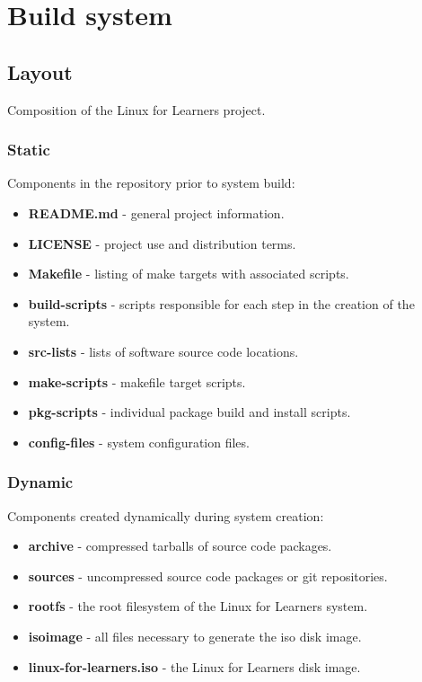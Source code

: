 \section{Build system}\label{Build system}

\subsection{Layout}

Composition of the Linux for Learners project.

\subsubsection{Static}

Components in the repository prior to system build:

\begin{itemize}
    \item \textbf{README.md} - general project information.
    \item \textbf{LICENSE} - project use and distribution terms.
    \item \textbf{Makefile} - listing of make targets with associated scripts.
    \item \textbf{build-scripts} - scripts responsible for each step in the creation of the system.
    \item \textbf{src-lists} - lists of software source code locations.
    \item \textbf{make-scripts} - makefile target scripts.
    \item \textbf{pkg-scripts} - individual package build and install scripts.
    \item \textbf{config-files} - system configuration files.
\end{itemize}

\subsubsection{Dynamic}

Components created dynamically during system creation:

\begin{itemize}
    \item \textbf{archive} - compressed tarballs of source code packages.
    \item \textbf{sources} - uncompressed source code packages or git repositories.
    \item \textbf{rootfs} - the root filesystem of the Linux for Learners system.
    \item \textbf{isoimage} - all files necessary to generate the iso disk image.
    \item \textbf{linux-for-learners.iso} - the Linux for Learners disk image.
\end{itemize}

